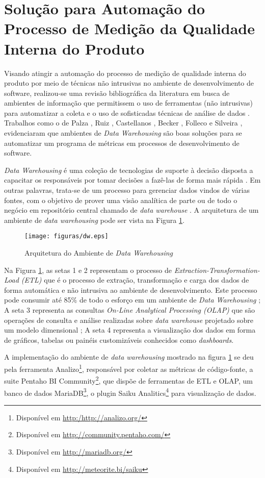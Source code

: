 \section{Solução para Automação do Processo de Medição da Qualidade Interna do Produto}
\label{sec:solucao}

Visando atingir a automação do processo de medição de qualidade interna do produto por meio de técnicas não intrusivas no ambiente de desenvolvimento de software, realizou-se uma revisão bibliográfica da literatura em busca de ambientes de informação que permitissem o uso de ferramentas (não intrusivas) para automatizar a coleta e o uso de sofisticadas técnicas de análise de dados \cite{Gopal2005} . Trabalhos como o de Palza \cite{Palza2003},  Ruiz \cite{Ruiz2005}, Castellanos \cite{Castellanos2005},  Becker \cite{Becker2006}, Folleco \cite{Folleco2007} e Silveira \cite{Silveira2010}, evidenciaram que ambientes de \textit{Data Warehousing} são boas soluções para se automatizar um programa de métricas em processos de desenvolvimento de software.

\textit{Data Warehousing} é uma coleção de tecnologias de suporte à decisão disposta a capacitar os responsáveis por tomar decisões a fazê-las de forma mais rápida \cite{chaudhuri1997}. Em outras palavras, trata-se de um processo para gerenciar dados vindos de várias fontes, com o objetivo de prover uma visão analítica de parte ou de todo o negócio em repositório central chamado de \textit{data warehouse} \cite{gardner1998} \cite{Kimball2002}. A arquitetura de um ambiente de \textit{data warehousing} pode ser vista na Figura \ref{arquitetura}. 

\begin{figure}[ht!]
\centering
\texttt{[image: figuras/dw.eps]}
\caption{Arquitetura do Ambiente de \textit{Data Warehousing}}
\label{arquitetura}
\end{figure}
\FloatBarrier

Na Figura \ref{arquitetura}, as setas 1 e 2 representam o processo de \textit{Extraction-Transformation-Load (ETL)} que é o processo de extração, transformação e carga dos dados de forma automática e não intrusiva ao ambiente de desenvolvimento. Este processo pode consumir até 85\% de todo o esforço em um ambiente de \textit{Data Warehousing} \cite{Kimball2002}; A seta 3 representa as consultas \textit{On-Line Analytical Processing (OLAP)} que são operações de consulta e análise realizadas sobre \textit{data warehouse} projetado sobre um modelo dimensional \cite{Kimball2002} \cite{Codd1993}; A seta 4 representa a visualização dos dados em forma de gráficos, tabelas ou painéis customizáveis conhecidos como \textit{dashboards}.

A implementação do ambiente de \textit{data warehousing} mostrado na figura \ref{arquitetura} se deu pela ferramenta Analizo\footnote{Disponível em \url{http:/http://analizo.org/}}, responsável por coletar as métricas de código-fonte, a suite Pentaho BI Community\footnote{Disponível em \url{http://community.pentaho.com/}}, que dispõe de ferramentas de ETL e OLAP, um banco de dados MariaDB\footnote{Disponível em \url{http://mariadb.org/}}, o plugin Saiku Analitics\footnote{Disponível em \url{http://meteorite.bi/saiku}} para visualização de dados.  